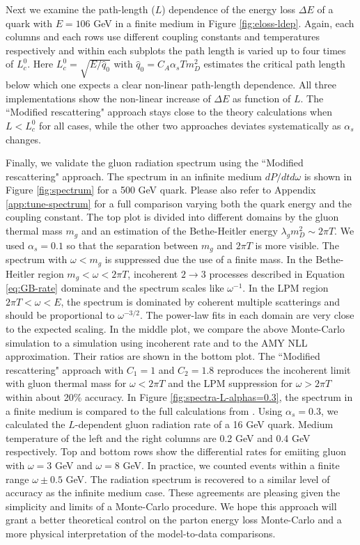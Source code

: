 \documentclass[aps, prc, reprint, amsmath, groupedaddress, nofootinbib]{revtex4-1}
\begin{document}
Next we examine the path-length ($L$) dependence of the energy loss $\Delta E$ of a quark with $E = 106$ GeV in a finite medium in Figure \ref{fig:eloss-ldep}.
Again, each columns and each rows use different coupling constants and temperatures respectively and within each subplots the path length is varied up to four times of $L_c^0$.
Here $L_c^0 = \sqrt{E/\hat{q}_0}$ with $\hat{q}_0 = C_A \alpha_s T m_D^2$ estimates the critical path length below which one expects a clear non-linear path-length dependence.
All three implementations show the non-linear increase of $\Delta E$ as function of $L$.
The ``Modified rescattering" approach stays close to the theory calculations when $L<L_c^0$ for all cases, while the other two approaches deviates systematically as $\alpha_s$ changes.

Finally, we validate the gluon radiation spectrum using the ``Modified rescattering" approach. 
The spectrum in an infinite medium $dP/dtd\omega$ is shown in Figure \ref{fig:spectrum} for a 500 GeV quark.
Please also refer to Appendix \ref{app:tune-spectrum} for a full comparison varying both the quark energy and the coupling constant.
The top plot is divided into different domains by the gluon thermal mass $m_g$ and an estimation of the Bethe-Heitler energy $\lambda_g m_D^2 \sim 2\pi T$.
We used $\alpha_s = 0.1$ so that the separation between $m_g$ and $2\pi T$ is more visible.
The spectrum with $\omega < m_g$ is suppressed due the use of a finite mass.
In the Bethe-Heitler region $m_g < \omega < 2\pi T$, incoherent $2\rightarrow 3$ processes described in Equation \ref{eq:GB-rate} dominate and the spectrum scales like $\omega^{-1}$.
In the LPM region $2\pi T < \omega < E$, the spectrum is dominated by coherent multiple scatterings and should be proportional to $\omega^{-3/2}$.
The power-law fits in each domain are very close to the expected scaling.
In the middle plot, we compare the above Monte-Carlo simulation to a simulation using incoherent rate and to the AMY NLL approximation. 
Their ratios are shown in the bottom plot.
The ``Modified rescattering" approach with $C_1 = 1$ and $C_2 = 1.8$ reproduces the incoherent limit with gluon thermal mass for $\omega < 2\pi T$ and the LPM suppression for $\omega > 2\pi T$ within about 20\% accuracy.
In Figure \ref{fig:spectra-L-alphas=0.3}, the spectrum in a finite medium is compared to the full calculations from \cite{CaronHuot:2008uh}.
Using $\alpha_s = 0.3$, we calculated the $L$-dependent gluon radiation rate of a 16 GeV quark.
Medium temperature of the left and the right columns are 0.2 GeV and 0.4 GeV respectively.
Top and bottom rows show the differential rates for emiiting gluon with $\omega = 3$ GeV and $\omega = 8$ GeV. 
In practice, we counted events within a finite range $\omega\pm 0.5$ GeV.
The radiation spectrum is recovered to a similar level of accuracy as the infinite medium case.
These agreements are pleasing given the simplicity and limits of a Monte-Carlo procedure. 
We hope this approach will grant a better theoretical control on the parton energy loss Monte-Carlo and a more physical interpretation of the model-to-data comparisons.
\end{document}
